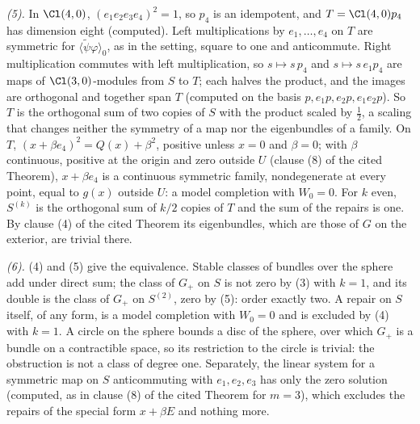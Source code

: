 \emph{(5).} In $\Cl(4,0)$, $(e_{1}e_{2}e_{3}e_{4})^{2} = 1$, so $p_{4}$ is an idempotent, and $T = \Cl(4,0)p_{4}$ has dimension eight (computed). Left multiplications by $e_{1}, \dots, e_{4}$ on $T$ are symmetric for $\langle \tilde\psi\varphi \rangle_{0}$, as in the setting, square to one and anticommute. Right multiplication commutes with left multiplication, so $s \mapsto s\,p_{4}$ and $s \mapsto s\,e_{1}p_{4}$ are maps of $\Cl(3,0)$-modules from $S$ to $T$; each halves the product, and the images are orthogonal and together span $T$ (computed on the basis $p, e_{1}p, e_{2}p, e_{1}e_{2}p$). So $T$ is the orthogonal sum of two copies of $S$ with the product scaled by $\tfrac12$, a scaling that changes neither the symmetry of a map nor the eigenbundles of a family. On $T$, $(x + \beta e_{4})^{2} = Q(x) + \beta^{2}$, positive unless $x = 0$ and $\beta = 0$; with $\beta$ continuous, positive at the origin and zero outside $U$ (clause (8) of the cited Theorem), $x + \beta e_{4}$ is a continuous symmetric family, nondegenerate at every point, equal to $g(x)$ outside $U$: a model completion with $W_{0} = 0$. For $k$ even, $S^{(k)}$ is the orthogonal sum of $k/2$ copies of $T$ and the sum of the repairs is one. By clause (4) of the cited Theorem its eigenbundles, which are those of $G$ on the exterior, are trivial there.

\emph{(6).} (4) and (5) give the equivalence. Stable classes of bundles over the sphere add under direct sum; the class of $G_{+}$ on $S$ is not zero by (3) with $k = 1$, and its double is the class of $G_{+}$ on $S^{(2)}$, zero by (5): order exactly two. A repair on $S$ itself, of any form, is a model completion with $W_{0} = 0$ and is excluded by (4) with $k = 1$. A circle on the sphere bounds a disc of the sphere, over which $G_{+}$ is a bundle on a contractible space, so its restriction to the circle is trivial: the obstruction is not a class of degree one. Separately, the linear system for a symmetric map on $S$ anticommuting with $e_{1}, e_{2}, e_{3}$ has only the zero solution (computed, as in clause (8) of the cited Theorem for $m = 3$), which excludes the repairs of the special form $x + \beta E$ and nothing more.
